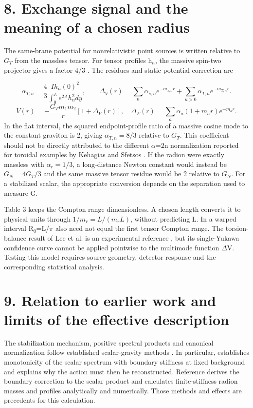 \documentclass[11pt,a4paper]{article}
\begin{document}
\section*{8. Exchange signal and the meaning of a chosen radius}
The same-brane potential for nonrelativistic point sources is written relative to \ensuremath{G_T} from the massless tensor. For tensor profiles h\ensuremath{{}_{n}}, the massive spin-two projector gives a factor 4/3 \cite{ref10}. The residues and static potential correction are

\begin{equation}
\alpha_{T,n}=\frac43\frac{I h_n(0)^2}{\int_0^Le^{2A}h_n^2dy},\qquad \Delta_V(r)=\sum_n\alpha_{s,n}e^{-m_{s,n}r}+\sum_{n>0}\alpha_{T,n}e^{-m_{T,n}r}.\tag{27}
\end{equation}
\begin{equation}
V(r)=-\frac{G_Tm_1m_2}{r}[1+\Delta_V(r)],\quad \Delta_F(r)=\sum_a\alpha_a(1+m_ar)e^{-m_ar}.\tag{28}
\end{equation}
In the flat interval, the squared endpoint-profile ratio of a massive cosine mode to the constant graviton is 2, giving \ensuremath{\alpha_{T,n}=8/3} relative to \ensuremath{G_T}. This coefficient should not be directly attributed to the different \ensuremath{\alpha}=2n normalization reported for toroidal examples by Kehagias and Sfetsos \cite{ref16}. If the radion were exactly massless with \ensuremath{\alpha_r=1/3}, a long-distance Newton constant would instead be \ensuremath{G_N=4G_T/3} and the same massive tensor residue would be 2 relative to \ensuremath{G_N}. For a stabilized scalar, the appropriate conversion depends on the separation used to measure G.

Table 3 keeps the Compton range dimensionless. A chosen length converts it to physical units through \ensuremath{1/m_r=L/(m_rL)}, without predicting L. In a warped interval R\ensuremath{{}_{0}}=L/\ensuremath{\pi} also need not equal the first tensor Compton range. The torsion-balance result of Lee et al. is an experimental reference \cite{ref11}, but its single-Yukawa confidence curve cannot be applied pointwise to the multimode function \ensuremath{\Delta}V. Testing this model requires source geometry, detector response and the corresponding statistical analysis.

\section*{9. Relation to earlier work and limits of the effective description}
The stabilization mechanism, positive spectral products and canonical normalization follow established scalar-gravity methods \cite{ref1,ref2,ref3,ref4,ref5,ref6,ref13,ref14,ref23}. In particular, \cite{ref6} establishes monotonicity of the scalar spectrum with boundary stiffness at fixed background and explains why the action must then be reconstructed. Reference \cite{ref23} derives the boundary correction to the scalar product and calculates finite-stiffness radion masses and profiles analytically and numerically. Those methods and effects are precedents for this calculation.
\end{document}
